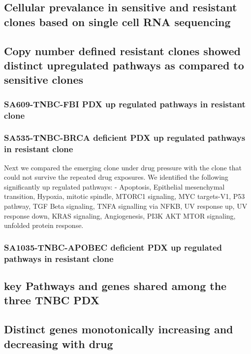 \subsection{Cellular prevalance in sensitive and resistant clones based on single cell RNA sequencing}

\subsection{Copy number defined resistant clones showed distinct upregulated pathways as compared to sensitive clones}

\subsubsection{SA609-TNBC-FBI PDX up regulated pathways in resistant clone}


\subsubsection{SA535-TNBC-BRCA deficient PDX up regulated pathways in resistant clone}
Next we compared the emerging clone under drug pressure with the clone that could not survive the repeated drug exposures. We identified the following significantly up regulated pathways:
- Apoptosis, Epithelial mesenchymal transition, Hypoxia, mitotic spindle, MTORC1 signaling, MYC targets-V1, P53 pathway, TGF Beta signaling, TNFA signalling via NFKB, UV response up, UV response down, KRAS signaling, Angiogenesis, PI3K AKT MTOR signaling, unfolded protein response.


\subsubsection{SA1035-TNBC-APOBEC deficient PDX up regulated pathways in resistant clone}




\subsection{key Pathways and genes shared among the three TNBC PDX}




\subsection{Distinct genes monotonically increasing and decreasing with drug} 


